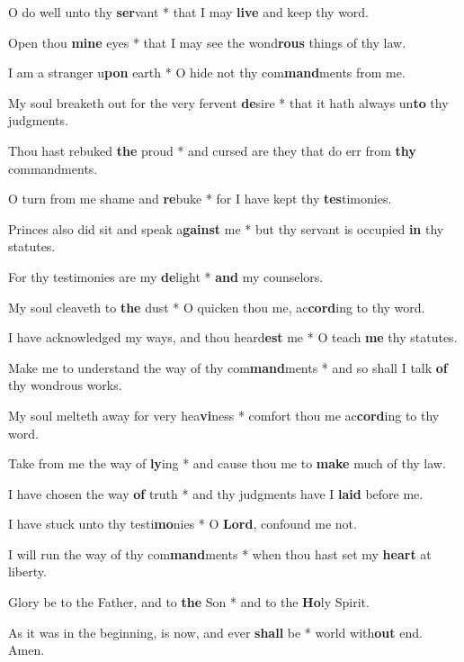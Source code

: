 \begin{multicols}{2}
	O do well unto thy \textbf{ser}vant * that I may \textbf{live} and keep thy word.
	
	Open thou \textbf{mine} eyes * that I may see the wond\textbf{rous} things of thy law.
	
	I am a stranger u\textbf{pon} earth * O hide not thy com\textbf{mand}ments from me.
	
	My soul breaketh out for the very fervent \textbf{de}sire * that it hath always un\textbf{to} thy judgments.
	
	Thou hast rebuked \textbf{the} proud * and cursed are they that do err from \textbf{thy} commandments.
	
	O turn from me shame and \textbf{re}buke * for I have kept thy \textbf{tes}timonies.
	
	Princes also did sit and speak a\textbf{gainst} me * but thy servant is occupied \textbf{in} thy statutes.
	
	For thy testimonies are my \textbf{de}light * \textbf{and} my counselors.
	
	My soul cleaveth to \textbf{the} dust * O quicken thou me, ac\textbf{cord}ing to thy word.
	
	I have acknowledged my ways, and thou heard\textbf{est} me * O teach \textbf{me} thy statutes.
	
	Make me to understand the way of thy com\textbf{mand}ments * and so shall I talk \textbf{of} thy wondrous works.
	
	My soul melteth away for very hea\textbf{vi}ness * comfort thou me ac\textbf{cord}ing to thy word.
	
	Take from me the way of \textbf{ly}ing * and cause thou me to \textbf{make} much of thy law.
	
	I have chosen the way \textbf{of} truth * and thy judgments have I \textbf{laid} before me.
	
	I have stuck unto thy testi\textbf{mo}nies * O \textbf{Lord}, confound me not.
	
	I will run the way of thy com\textbf{mand}ments * when thou hast set my \textbf{heart} at liberty.
	
	Glory be to the Father, and to \textbf{the} Son * and to the \textbf{Ho}ly Spirit.
	
	As it was in the beginning, is now, and ever \textbf{shall} be * world with\textbf{out} end. Amen.
\end{multicols}